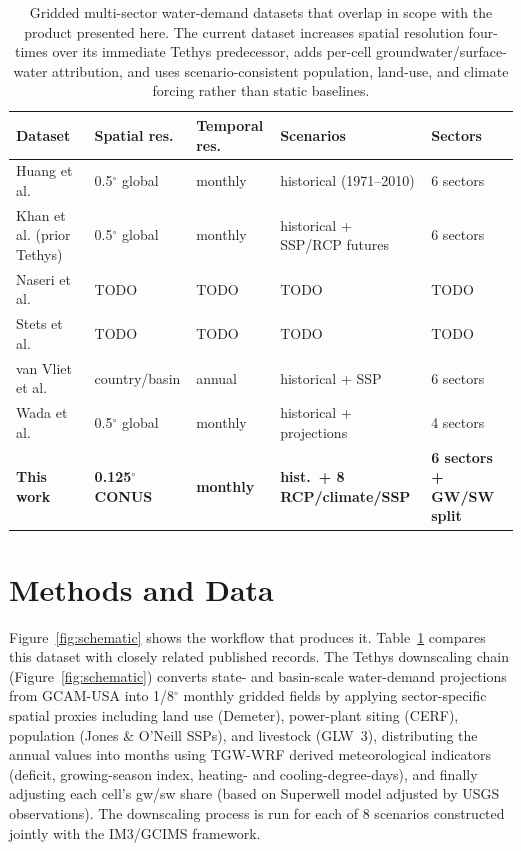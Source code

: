 \documentclass[fleqn,10pt]{wlscirep}
\begin{document}
\begin{table}[ht]
\centering
\small
\begin{tabular}{lllll}
\toprule
\textbf{Dataset} & \textbf{Spatial res.} & \textbf{Temporal res.} & \textbf{Scenarios} & \textbf{Sectors} \\
\midrule
Huang et al.\cite{Huang2018}                   & 0.5$^{\circ}$ global & monthly & historical (1971--2010) & 6 sectors \\
Khan et al.\cite{Khan2023} (prior Tethys)      & 0.5$^{\circ}$ global & monthly & historical + SSP/RCP futures & 6 sectors \\
Naseri et al.\cite{naseri2025united}           &  TODO & TODO  & TODO  & TODO  \\
Stets et al.\cite{Stets2025USGS}               &  TODO & TODO  & TODO  & TODO  \\
van Vliet et al.\cite{van_Vliet_2021}          & country/basin & annual & historical + SSP & 6 sectors \\
Wada et al.\cite{Wada_2017}                    & 0.5$^{\circ}$ global & monthly & historical + projections & 4 sectors \\
\textbf{This work}                             & \textbf{0.125$^{\circ}$ CONUS} & \textbf{monthly} & \textbf{hist.\ + 8 RCP/climate/SSP} & \textbf{6 sectors + GW/SW split} \\
\bottomrule
\end{tabular}
\caption{Gridded multi-sector water-demand datasets that overlap in scope with the product presented here. The current dataset increases spatial resolution four-times over its immediate Tethys predecessor\cite{Khan2023}, adds per-cell groundwater/surface-water attribution, and uses scenario-consistent population, land-use, and climate forcing rather than static baselines.}
\label{tab:prior-datasets}
\end{table}

\section*{Methods and Data}


Figure~\ref{fig:schematic} shows the workflow that produces it. Table~\ref{tab:prior-datasets} compares this dataset with closely related published records. The Tethys downscaling chain (Figure~\ref{fig:schematic}) converts state- and basin-scale water-demand projections from GCAM-USA\cite{Zhao_gcamusa_water,Zhao2024,Calvin2019GCAM,Binsted_2022} into 1/8$^{\circ}$ monthly gridded fields by applying sector-specific spatial proxies including land use (Demeter\cite{Vernon-2018}), power-plant siting (CERF\cite{Zhao2024,Mongird2025CERF}), population (Jones \& O'Neill SSPs\cite{Jones_2016}), and livestock (GLW~3\cite{Gilbert2018}), distributing the annual values into months using TGW-WRF\cite{Jones2023TGW} derived meteorological indicators (deficit, growing-season index, heating- and cooling-degree-days), and finally adjusting each cell's gw/sw share (based on Superwell\cite{Niazi2024PeakWater} model adjusted by USGS observations). The downscaling process is run for each of 8 scenarios constructed jointly with the IM3/GCIMS framework\cite{Zhao2024,Mongird2025CERF}. 
\end{document}
